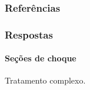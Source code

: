 \documentclass[svgnames,smaller,table]{beamer}
\begin{document}
\begin{frame}[allowframebreaks]
        \frametitle{Referências}
        
        
\end{frame}


\begin{frame}[noframenumbering]
  \frametitle{Respostas}
  \framesubtitle{Seções de choque}
  Tratamento complexo.
\end{frame}
\end{document}
